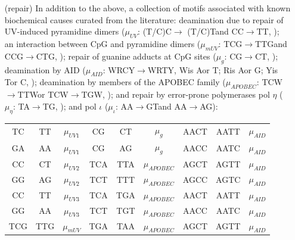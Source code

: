 \documentclass{article}
\newcommand{\nA}{\mbox{A}}  %
\newcommand{\nC}{\mbox{C}}
\newcommand{\nG}{\mbox{G}}
\newcommand{\nT}{\mbox{T}}
\newcommand{\nW}{\mbox{W}}
\newcommand{\nR}{\mbox{R}}
\newcommand{\nY}{\mbox{Y}}
\theoremstyle{plain}
\theoremstyle{definition}
\begin{document}
\begin{itemize}
      \item[(repair)] In addition to the above, a collection of motifs associated with known biochemical causes
          curated from the literature:
          deamination due to repair of UV-induced pyramidine dimers ($\mu_{UV}$: (\nT/\nC)\nC $\to$ (\nT/\nC)\nT and \nC\nC$\to$\nT\nT, \citet{uv_damage});
          an interaction between CpG and pyramidine dimers ($\mu_{mUV}$: \nT\nC\nG$\to$\nT\nT\nG and \nC\nC\nG$\to$\nC\nT\nG, \citet{cpg_review});
          repair of guanine adducts at CpG sites ($\mu_g$: \nC\nG$\to$\nC\nT, \citet{tobacco});
          deamination by AID ($\mu_{AID}$: \nW\nR\nC\nY$\to$\nW\nR\nT\nY, \nW is \nA or \nT; \nR is \nA or \nG; \nY is \nT or \nC, \citet{AID});
          deamination by members of the APOBEC family ($\mu_{APOBEC}$: \nT\nC\nW$\to$\nT\nT\nW or \nT\nC\nW$\to$\nT\nG\nW, \citet{APOBEC});
          and repair by error-prone polymerases pol $\eta$ ($\mu_\eta$: \nT\nA$\to$\nT\nG, \citet{pol_eta});
          and pol $\iota$ ($\mu_{\iota}$: \nA\nA$\to$\nG\nT and \nA\nA$\to$\nA\nG \citet{pol_iota}):
          \begin{center}
            \begin{tabular}{c@{\quad$\to$\quad}c@{\quad at rate\quad }c|c@{\quad$\to$\quad}c@{\quad at rate\quad }c|c@{\quad$\to$\quad}c@{\quad at rate\quad }c}
                \nT\nC     &   \nT\nT      &  $\mu_{UV1}$    & \nC\nG     &   \nC\nT      &  $\mu_{g}$      & \nA\nA\nC\nT  &   \nA\nA\nT\nT   &  $\mu_{AID}$ \\
                \nG\nA     &   \nA\nA      &  $\mu_{UV1}$    & \nC\nG     &   \nA\nG      &  $\mu_{g}$      & \nA\nA\nC\nC  &   \nA\nA\nT\nC   &  $\mu_{AID}$ \\
                \nC\nC     &   \nC\nT      &  $\mu_{UV2}$    & \nT\nC\nA  &   \nT\nT\nA   &  $\mu_{APOBEC}$ & \nA\nG\nC\nT  &   \nA\nG\nT\nT   &  $\mu_{AID}$ \\
                \nG\nG     &   \nA\nG      &  $\mu_{UV2}$    & \nT\nC\nT  &   \nT\nT\nT   &  $\mu_{APOBEC}$ & \nA\nG\nC\nC  &   \nA\nG\nT\nC   &  $\mu_{AID}$ \\
                \nC\nC     &   \nT\nT      &  $\mu_{UV3}$    & \nT\nC\nA  &   \nT\nG\nA   &  $\mu_{APOBEC}$ & \nA\nA\nC\nT  &   \nA\nA\nT\nT   &  $\mu_{AID}$ \\
                \nG\nG     &   \nA\nA      &  $\mu_{UV3}$    & \nT\nC\nT  &   \nT\nG\nT   &  $\mu_{APOBEC}$ & \nA\nA\nC\nC  &   \nA\nA\nT\nC   &  $\mu_{AID}$ \\
                \nT\nC\nG  &   \nT\nT\nG   &  $\mu_{mUV}$    & \nT\nG\nA  &   \nT\nA\nA   &  $\mu_{APOBEC}$ & \nA\nG\nC\nT  &   \nA\nG\nT\nT   &  $\mu_{AID}$ \\

\end{tabular}
\end{center}
\end{itemize}
\end{document}
